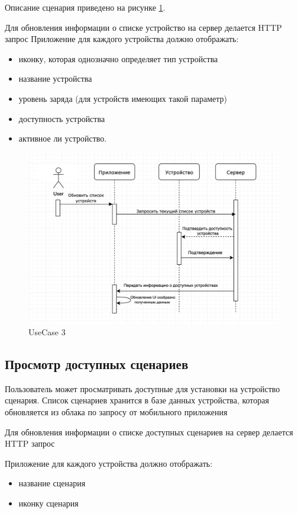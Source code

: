 Описание сценария приведено на рисунке \ref{fig:pic_useCase3}.


    Для обновления информации о списке устройство на сервер делается HTTP запрос
    Приложение для каждого устройства должно отображать:
\begin{itemize}
    \item иконку, которая однозначно определяет тип устройства 
    \item название устройства
    \item уровень заряда (для устройств имеющих такой параметр)
    \item доступность устройства
    \item активное ли устройство.
\end{itemize}


\begin{figure}[ht]
   \centering
   \includegraphics[scale=.5]{figures/pic_useCase3}
    \caption{UseCase 3}
    \label{fig:pic_useCase3}
\end{figure}

\subsection{Просмотр доступных сценариев}

Пользователь может просматривать доступные для установки на устройство сценария. Список сценариев хранится в базе данных устройства, которая обновляется из облака по запросу от мобильного приложения

Для обновления информации о списке доступных сценариев на сервер делается HTTP запрос

Приложение для каждого устройства должно отображать:
\begin{itemize}
 \item название сценария
  \item иконку сценария
\end{itemize}


